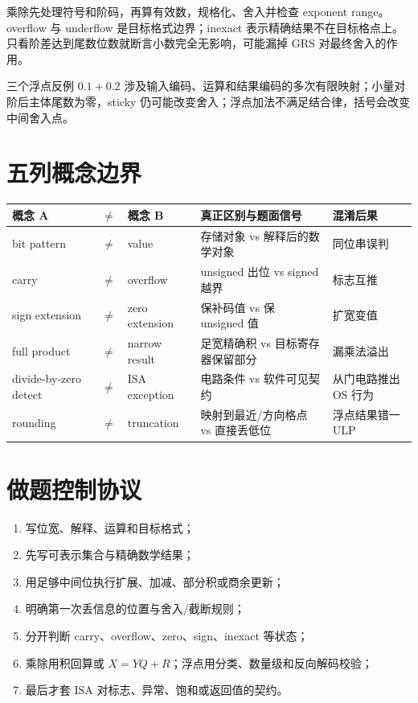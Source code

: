 \documentclass[UTF8,fontset=fandol,11pt,a4paper]{ctexart}
\begin{document}
乘除先处理符号和阶码，再算有效数，规格化、舍入并检查 exponent range。overflow 与 underflow 是目标格式边界；inexact 表示精确结果不在目标格点上。只看阶差达到尾数位数就断言小数完全无影响，可能漏掉 GRS 对最终舍入的作用。

\begin{warnbox}{三个浮点反例}
$0.1+0.2$ 涉及输入编码、运算和结果编码的多次有限映射；小量对阶后主体尾数为零，sticky 仍可能改变舍入；浮点加法不满足结合律，括号会改变中间舍入点。
\end{warnbox}

\section{五列概念边界}
\begin{center}\small
\begin{tabularx}{\linewidth}{L{1.8cm}C{0.35cm}L{1.9cm}YY}\toprule
概念 A & $\neq$ & 概念 B & 真正区别与题面信号 & 混淆后果\\\midrule
bit pattern & $\neq$ & value & 存储对象 vs 解释后的数学对象 & 同位串误判\\
carry & $\neq$ & overflow & unsigned 出位 vs signed 越界 & 标志互推\\
sign extension & $\neq$ & zero extension & 保补码值 vs 保 unsigned 值 & 扩宽变值\\
full product & $\neq$ & narrow result & 足宽精确积 vs 目标寄存器保留部分 & 漏乘法溢出\\
divide-by-zero detect & $\neq$ & ISA exception & 电路条件 vs 软件可见契约 & 从门电路推出 OS 行为\\
rounding & $\neq$ & truncation & 映射到最近/方向格点 vs 直接丢低位 & 浮点结果错一 ULP\\
\bottomrule
\end{tabularx}
\end{center}

\section{做题控制协议}
\begin{enumerate}
\item 写位宽、解释、运算和目标格式；
\item 先写可表示集合与精确数学结果；
\item 用足够中间位执行扩展、加减、部分积或商余更新；
\item 明确第一次丢信息的位置与舍入/截断规则；
\item 分开判断 carry、overflow、zero、sign、inexact 等状态；
\item 乘除用积回算或 $X=YQ+R$；浮点用分类、数量级和反向解码校验；
\item 最后才套 ISA 对标志、异常、饱和或返回值的契约。
\end{enumerate}
\end{document}
